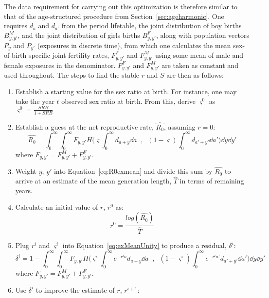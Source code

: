 The data requirement for carrying out this optimization is therefore similar to
that of the age-structured procedure from Section~\ref{sec:ageharmonic}. One
requires $d_a$ and $d_{a'}$ from the period lifetable, the joint distribution
of boy births $B_{y,y'}^M$, and the joint distribution of girls
births $B_{y,y'}^F$, along with population vectors $P_y$ and $P_{y'}$ (exposures
in discrete time), from which one calculates the mean sex-of-birth
specific joint fertility rates, $F_{y,y'}^F$ and $F_{y,y'}^M$ using some mean of
male and female exposures in the denominator. $F_{y,y'}^F$ and $F_{y,y'}^M$ are
taken as constant and used throughout. The steps to find the stable $r$ and $S$
are then as follows:
\begin{enumerate}
  \item Establish a starting value for the sex ratio at birth. For instance, one
  may take the year $t$ observed sex ratio at birth. From this, derive
  $\varsigma^0$ as $\varsigma^0 = \frac{SRB}{1+SRB}$
  \item Establish a guess at the net reproductive rate, $\widehat{R_0}$,
  assuming $r = 0$:
  \begin{equation}
  \label{eq:R0exmean}
  \widehat{R_0} = \int_0^\infty \int_0^\infty F_{y,y'} H\Bigg(\varsigma \int _0^\infty
 d_{a+y}\dd a\;\;,\;\; (1-\varsigma) \int _0^\infty
 d_{a'+y'} \dd a'\Bigg) \dd y \dd y'
  \end{equation}
  where $F_{y,y'} = F_{y,y'}^M + F_{y,y'}^F$.
  \item Weight $y$, $y'$ into Equation~\eqref{eq:R0exmean} and divide this sum
  by $\widehat{R_0}$ to arrive at an estimate of the mean generation length,
  $\widehat{T}$ in terms of remaining years. 
  \item Calculate an initial value of $r$, $r^0$ as:
  \begin{equation}
  r^0 = \frac{log(\widehat{R_0})}{\widehat{T}}
  \end{equation}
  \item Plug $r^i$ and $\varsigma^i$ into Equation~\eqref{eq:exMeanUnity} to
  produce a residual, $\delta^i$:
  \begin{equation}
 \label{eq:exMeanUnity}
 \delta^i = 1 - \int_0^\infty \int_0^\infty F_{y,y'} H\Bigg(\varsigma^i \int
 _0^\infty e^{-r^ia}d_{a+y}\dd a\;\;,\;\; (1-\varsigma^i) \int _0^\infty
 e^{-r^ia'}d_{a'+y'} \dd a'\Bigg) \dd y \dd y'
 \end{equation}
where $F_{y,y'} = F_{y,y'}^M + F_{y,y'}^F$.
  \item  Use $\delta^i$ to improve the estimate of $r$, $r^{i+1}$:

\end{enumerate}
